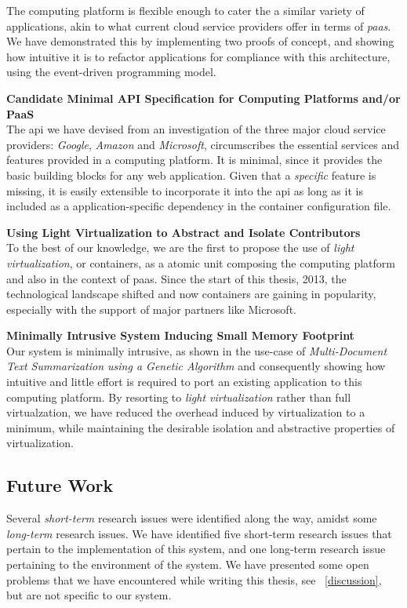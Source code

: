 \documentclass[12pt, titlepage]{uo_temp}
\begin{document}
     The computing platform is flexible enough to cater the a similar variety of
     applications, akin to what current cloud service providers offer in terms of
     \emph{paas}. We have demonstrated this by implementing two proofs of concept, and
     showing how intuitive it is to refactor applications for compliance with this
     architecture, using the event-driven programming model.

     \textbf{Candidate Minimal API Specification for Computing Platforms and/or PaaS}\\
     The \gls{api} we have devised from an investigation of the three major cloud service
     providers: \emph{Google}, \emph{Amazon} and \emph{Microsoft}, circumscribes the
     essential services and features provided in a computing platform. It is minimal,
     since it provides the basic building blocks for any web application. Given that a
     \emph{specific} feature is missing, it is easily extensible to incorporate it into
     the \gls{api} as long as it is included as a application-specific dependency in the
     container configuration file.

     \textbf{Using Light Virtualization to Abstract and Isolate Contributors}\\
     To the best of our knowledge, we are the first to propose the use of \emph{light
       virtualization}, or containers, as a atomic unit composing the computing
     platform and also in the context of \gls{paas}. Since the start of this thesis, 2013,
     the technological landscape shifted and now containers are gaining in popularity,
     especially with the support of major partners like Microsoft.

     \textbf{Minimally Intrusive System Inducing Small Memory Footprint}\\
     Our system is minimally intrusive, as shown in the use-case of \emph{Multi-Document Text
     Summarization using a Genetic Algorithm} and consequently showing how intuitive and
     little effort is required to port an existing application to this computing
     platform. By resorting to \emph{light virtualization} rather than full virtualzation,
     we have reduced the overhead induced by virtualization to a minimum, while
     maintaining the desirable isolation and abstractive properties of virtualization.

     \subsection{Future Work}
     Several \emph{short-term} research issues were identified along the way, amidst some
     \emph{long-term} research issues. We have identified five short-term research issues
     that pertain to the implementation of this system, and one long-term research issue
     pertaining to the environment of the system. We have presented some open problems
     that we have encountered while writing this thesis, see ~\ref{discussion}, but are
     not specific to our system.
\end{document}
